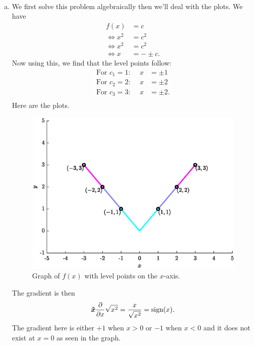 \documentclass[12pt]{article} %
\begin{document}
\begin{solution}~
\begin{enumerate}[(a)]
    \item We first solve this problem algebraically then we'll deal with the plots.  We have
    \begin{align*}
        f(x)&=c\\
        \iff x^2 &= c^2\\
        \iff x^2&= c^2\\
        \iff x &= -\pm c.
    \end{align*}
    Now using this, we find that the level points follow:
    \begin{align*}
        \textrm{For $c_1=1$:~}\quad x&=\pm 1\\
        \textrm{For $c_2=2$:~}\quad x&=\pm 2\\
        \textrm{For $c_3=3$:~}\quad x&=\pm 2.\\
    \end{align*}
    Here are the plots.
    \begin{figure}[H]
        \centering
        \includegraphics[width=.6\textwidth]{figures/7a}
        \caption{Graph of $f(x)$ with level points on the $x$-axis.}
    \end{figure}
    
    The gradient is then
    \[
    \boldsymbol{\hat{x}} \frac{\partial}{\partial x} \sqrt{x^2} = \frac{x}{\sqrt{x^2}} = \textrm{sign}(x).
    \]
    The gradient here is either $+1$ when $x>0$ or $-1$ when $x<0$ and it does not exist at $x=0$ as seen in the graph.


\end{enumerate}
\end{solution}
\end{document}
